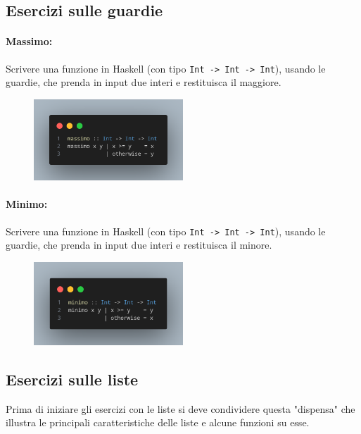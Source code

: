 \subsection{Esercizi sulle guardie}

\paragraph{Massimo:} Scrivere una funzione in Haskell (con tipo \texttt{Int -> Int -> Int}), usando 
le guardie, che
prenda in input due interi e restituisca il maggiore.

\begin{figure}[!h]
    \centering
    \includegraphics[width=0.5\textwidth]{images/Massimo.png}
\end{figure}

\paragraph{Minimo:} Scrivere una funzione in Haskell (con tipo \texttt{Int -> Int -> Int}), usando 
le guardie, che
prenda in input due interi e restituisca il minore.

\begin{figure}[!h]
    \centering
    \includegraphics[width=0.5\textwidth]{images/Minimo.png}
\end{figure}

\pagebreak

\subsection{Esercizi sulle liste}

Prima di iniziare gli esercizi con le liste si deve condividere questa "dispensa"
che illustra le principali caratteristiche delle liste e alcune funzioni su esse.

